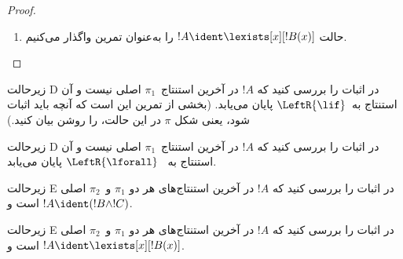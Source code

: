 \documentclass[../../../include/open-logic-section]{subfiles}
\begin{document}
\begin{proof}
\begin{enumerate}
دنبالهٔ پایانی !!{proof}~$\pi_1'$ برابر
$\Gamma\Sequent\Delta,!B(c)$ است، که در آن $c$ متغیر ویژهٔ یک استنتاج
\RightR{\lforall} است. پس $c$ در~$!B(x)$، $\Gamma$ یا~$\Delta$ ظاهر
نمی‌شود. فرض می‌کنیم !!{proof}~$\pi$ منظم است؛ بنابراین $c$ فقط متغیر
ویژهٔ همین استنتاج \RightR{\lforall} است و فقط بالای آن، یعنی فقط در
~$\pi_1'$، ظاهر می‌شود و متغیر ویژهٔ استنتاجی در~$\pi_1'$ نیست. چون
$c$ در~$\pi_2$ ظاهر نمی‌شود، نمی‌تواند در~$t$ باشد. بنا بر
، !!{proof}
~$\Subst{\pi_1'}{t}{c}$ یک !!a{proof} برای
$\Gamma\Sequent\Delta,!B(t)$ است. اکنون فرض استقرا را بر !!{proof}
زیر اعمال می‌کنیم:
\[
\AxiomC{}
\RightLabel{$\Subst{\pi_1'}{t}{c}$}
\Deduce$\Gamma \fCenter \Delta, !B(t)$
\AxiomC{}
\RightLabel{$\pi_2''$}
\Deduce$!B(t), \Gamma \fCenter \Delta$
\RightLabel{\CutCS}
\BinaryInf$\Gamma \fCenter \Delta$
\DisplayProof
\]
(فرض استقرا اعمال می‌شود، زیرا !!{formula} برش~$!B(t)$ است و این
!!{proof} رتبهٔ برش کمتری از~$\pi$ دارد.)

\item حالت $!A\ident\lexists[x][!B(x)]$ را به‌عنوان تمرین واگذار
می‌کنیم.
\end{enumerate}
\end{proof}

\begin{prob}
زیرحالت D در اثبات  را بررسی کنید که $!A$ در
آخرین استنتاج~$\pi_1$ اصلی نیست و آن استنتاج به~$\LeftR{\lif}$ پایان
می‌یابد. (بخشی از تمرین این است که آنچه باید اثبات شود، یعنی شکل
$\pi$ در این حالت، را روشن بیان کنید.)
\end{prob}

\begin{prob}
زیرحالت D در اثبات  را بررسی کنید که $!A$ در
آخرین استنتاج~$\pi_1$ اصلی نیست و آن استنتاج به
~$\LeftR{\lforall}$ پایان می‌یابد.
\end{prob}

\begin{prob}
زیرحالت E در اثبات  را بررسی کنید که $!A$ در
آخرین استنتاج‌های هر دو $\pi_1$ و~$\pi_2$ اصلی است و
$!A\ident(!B\land !C)$.
\end{prob}

\begin{prob}
زیرحالت E در اثبات  را بررسی کنید که $!A$ در
آخرین استنتاج‌های هر دو $\pi_1$ و~$\pi_2$ اصلی است و
$!A\ident\lexists[x][!B(x)]$.
\end{prob}
\end{document}
